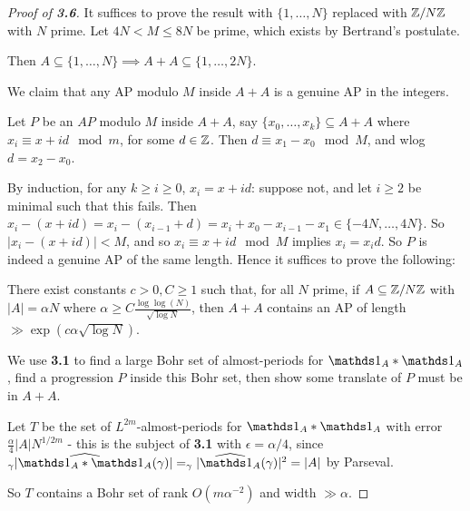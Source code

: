 \documentclass[10pt,a4paper]{article}
\let\E\relax
\DeclareMathOperator*{\E}{\raisebox{-0.45em}{\text{\huge $\mathds{E}$}}}
\begin{document}
\begin{proof}[Proof of \textbf{3.6}]
  It suffices to prove the result with $\{1, \ldots, N\}$ replaced with $\mathbb{Z}/N\mathbb{Z}$ with $N$ prime. Let $4N < M \leq 8N$ be prime, which exists by Bertrand's postulate.

  Then $A \subseteq \{1, \ldots, N\} \implies A+A \subseteq \{1, \ldots, 2N\}$.

  We claim that any AP modulo $M$ inside $A+A$ is a genuine AP in the integers.

  Let $P$ be an $AP$ modulo $M$ inside $A+A$, say $\{x_0, \ldots, x_k\}\subseteq A+A$ where $x_i \equiv x+id \mod m$, for some $d \in \mathbb{Z}$. Then $d \equiv x_1-x_0 \mod M$, and wlog $d = x_2-x_0$.

  By induction, for any $k \geq i \geq 0$, $x_i=x + id$: suppose not, and let $i \geq 2$ be minimal such that this fails. Then $x_i - (x+id) = x_i - (x_{i-1}+d) = x_i +x_0 -x_{i-1}-x_1 \in \{-4N, \ldots, 4N\}$. So $|x_i - (x+id)| < M$, and so $x_i \equiv x+id \mod M$ implies $x_i = x_id$. So $P$ is indeed a genuine AP of the same length. Hence it suffices to prove the following:

  There exist constants $c>0, C \geq 1$ such that, for all $N$ prime, if $A \subseteq \mathbb{Z}/N\mathbb{Z}$ with $|A| = \alpha N$ where $\alpha \geq C \frac{\log\log(N)}{\sqrt{\log N}}$, then $A+A$ contains an AP of length $\gg \exp(c \alpha \sqrt{\log N})$.

  We use \textbf{3.1} to find a large Bohr set of almost-periods for $\one_A \ast \one_A$, find a progression $P$ inside this Bohr set, then show some translate of $P$ must be in $A+A$.

  Let $T$ be the set of $L^{2m}$-almost-periods for $\one_A \ast \one_A$ with error $\frac{\alpha}{4}|A|N^{1/2m}$ - this is the subject of \textbf{3.1} with $\epsilon = \alpha/4$, since $\E_\gamma|\hat{\one_A \ast \one_A}(\gamma)| = \E_\gamma |\hat{\one_A}(\gamma)|^2 = |A|$ by Parseval.

  So $T$ contains a Bohr set of rank $O(m\alpha^{-2})$ and width $\gg \alpha$.


\end{proof}
\end{document}
